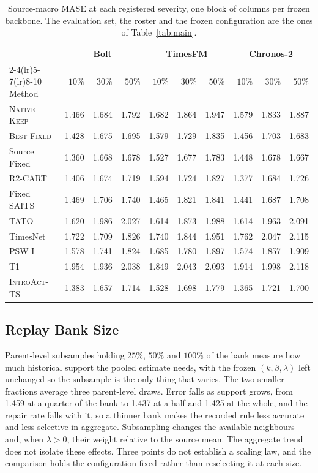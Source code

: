 \documentclass{article}
\newcommand{\introact}{\textsc{IntroAct-TS}}
\begin{document}
\begin{table}[!t]
  \caption{Source-macro MASE at each registered severity, one block of columns per frozen
  backbone. The evaluation set, the roster and the frozen configuration are the ones of
  Table~\ref{tab:main}.}
  \label{tab:app-trend}
  \centering
  \small
  \setlength{\tabcolsep}{4pt}
\begin{tabular*}{\textwidth}{@{\extracolsep{\fill}}lrrrrrrrrr@{}}
    \toprule
     & \multicolumn{3}{c}{Bolt} & \multicolumn{3}{c}{TimesFM} & \multicolumn{3}{c}{Chronos-2} \\
    \cmidrule(lr){2-4}\cmidrule(lr){5-7}\cmidrule(lr){8-10}
    Method & $10\%$ & $30\%$ & $50\%$ & $10\%$ & $30\%$ & $50\%$ & $10\%$ & $30\%$ & $50\%$ \\
    \midrule
    \textsc{Native Keep} & 1.466 & 1.684 & 1.792 & 1.682 & 1.864 & 1.947 & 1.579 & 1.833 & 1.887 \\
    \textsc{Best Fixed} & 1.428 & 1.675 & 1.695 & 1.579 & 1.729 & 1.835 & 1.456 & 1.703 & 1.683 \\
    Source Fixed & 1.360 & 1.668 & 1.678 & 1.527 & 1.677 & 1.783 & 1.448 & 1.678 & 1.667 \\
    R2-CART & 1.406 & 1.674 & 1.719 & 1.594 & 1.724 & 1.827 & 1.377 & 1.684 & 1.726 \\
    Fixed SAITS & 1.469 & 1.706 & 1.740 & 1.465 & 1.821 & 1.841 & 1.441 & 1.687 & 1.708 \\
    TATO & 1.620 & 1.986 & 2.027 & 1.614 & 1.873 & 1.988 & 1.614 & 1.963 & 2.091 \\
    TimesNet & 1.722 & 1.709 & 1.826 & 1.740 & 1.844 & 1.951 & 1.762 & 2.047 & 2.115 \\
    PSW-I & 1.578 & 1.741 & 1.824 & 1.685 & 1.780 & 1.897 & 1.574 & 1.857 & 1.909 \\
    T1 & 1.954 & 1.936 & 2.038 & 1.849 & 2.043 & 2.093 & 1.914 & 1.998 & 2.118 \\
    \midrule
    \introact{} & 1.383 & 1.657 & 1.714 & 1.528 & 1.698 & 1.779 & 1.365 & 1.721 & 1.700 \\
    \bottomrule
  \end{tabular*}
\end{table}

\subsection{Replay Bank Size}
\label{app:replaysize}
Parent-level subsamples holding $25\%$, $50\%$ and $100\%$ of the bank measure how much
historical support the pooled estimate needs, with the frozen $(k,\beta,\lambda)$ left
unchanged so the subsample is the only thing that varies. The two smaller fractions average
three parent-level draws. Error falls as support grows, from 1.459 at a quarter of the bank to
1.437 at a half and 1.425 at the whole, and the repair rate falls with it, so a thinner bank
makes the recorded rule less accurate and less selective in aggregate. Subsampling changes
the available neighbours and, when $\lambda>0$, their weight relative to the source mean.
The aggregate trend does not isolate these effects. Three points do not
establish a scaling law, and the comparison holds the configuration fixed rather than
reselecting it at each size.
\end{document}
